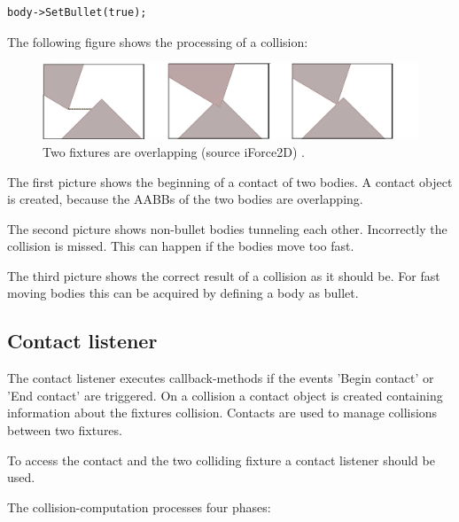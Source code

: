 \documentclass[10pt,a4paper,DIV=11]{scrreprt}
\begin{document}
\begin{lstlisting}[caption={Define fixture as bullet after creation},label=lst:fixture-bullet-after]
body->SetBullet(true);
\end{lstlisting}

The following figure shows the processing of a collision:

\begin{center}
	\begin{figure}[H]
		\centering
		\includegraphics[width=1.0\textwidth,scale=1.0]{files/fixtures-overlap.png}
		\caption{Two fixtures are overlapping (source iForce2D) \cite{box2d-iforce}.}
		\label{fig:fixture-overlap}
	\end{figure}
\end{center}

The first picture shows the beginning of a contact of two bodies. A contact object is created, because the AABBs of the two bodies are overlapping.

The second picture shows non-bullet bodies tunneling each other. Incorrectly the collision is missed. This can happen if the bodies move too fast.

The third picture shows the correct result of a collision as it should be. For fast moving bodies this can be acquired by defining a body as bullet.

\subsection{Contact listener}
The contact listener executes callback-methods if the events 'Begin contact' or 'End contact' are triggered.
On a collision a contact object is created containing information about the fixtures collision.
Contacts are used to manage collisions between two fixtures.

To access the contact and the two colliding fixture a contact listener should be used.

The collision-computation processes four phases: \\

   \\
\\
\end{document}
